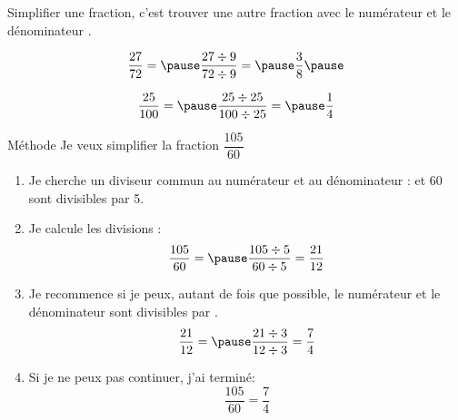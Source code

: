\documentclass[xcolor={dvipsnames}]{beamer}
\begin{document}
	\begin{frame}
		\begin{mydef}
			Simplifier une fraction, c'est trouver une autre fraction  avec le numérateur et le dénominateur .\pause
		\end{mydef}
		
		\begin{myex}
			
			\begin{equation*}
				\dfrac{\num{27}}{\num{72}} = \pause \dfrac{\num{27} \div 9 }{\num{72} \div 9 } = \pause \dfrac{\num{3}}{\num{8}} \pause
			\end{equation*}	
			
			\begin{equation*}
				\dfrac{\num{25}}{\num{100}} = \pause \dfrac{\num{25} \div 25 }{\num{100} \div 25 } = \pause \dfrac{\num{1}}{\num{4}} 
			\end{equation*}	
			
		\end{myex}
	\end{frame}
	
	
	\begin{frame}
		\begin{block}{Méthode}
			Je veux simplifier la fraction $\dfrac{105}{60}$ \pause
			
			\begin{enumerate}
				\item Je cherche un diviseur commun au numérateur et au dénominateur :  et 60 sont divisibles par 5.
				\item Je calcule les divisions :
				\begin{equation*}
					\frac{105}{60} = \pause \frac{105 \div 5}{60 \div 5 } = \frac{21}{12}
				\end{equation*}
				
				\vspace*{-0.3cm}
				\item Je recommence si je peux, autant de fois que possible, le numérateur et le dénominateur sont divisibles par \pause 3.
				\begin{equation*}
					\frac{21}{12} = \pause \frac{21 \div 3}{12 \div 3} = \frac{7}{4}		
				\end{equation*}
				
				\vspace*{-0.3cm}
				\item Si je ne peux pas continuer, j'ai terminé:
				\begin{equation*}
					\frac{105}{60} = \frac{7}{4}		
				\end{equation*}
			\end{enumerate}
		\end{block}
	\end{frame}
	
\end{document}
